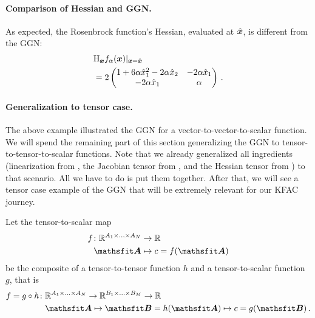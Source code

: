 \begin{example}
 \paragraph{Comparison of Hessian and GGN.}
 As expected, the Rosenbrock function's Hessian, evaluated at $\hat{{\bm{x}}}$, is different from the GGN:
  \begin{align*}
    &\mathrm{H}_{{\bm{x}}} f_{\alpha}({\bm{x}})|_{{\bm{x}} = \hat{{\bm{x}}}}
      \\
    &=
    2
    \begin{pmatrix}
      1 + 6 \alpha \hat{x}_1^2 - 2 \alpha \hat{x}_2 & -2 \alpha \hat{x}_1 \\
      -2 \alpha \hat{x}_1                      & \alpha
    \end{pmatrix}\,.
  \end{align*}
\end{example}

\paragraph{Generalization to tensor case.} The above example illustrated the GGN for a vector-to-vector-to-scalar function.
We will spend the remaining part of this section generalizing the GGN to tensor-to-tensor-to-scalar functions.
Note that we already generalized all ingredients (linearization from , the Jacobian tensor from , and the Hessian tensor from ) to that scenario.
All we have to do is put them together.
After that, we will see a tensor case example of the GGN that will be extremely relevant for our KFAC journey.

\switchcolumn[1]
\switchcolumn[0]

\begin{setup}\label{setup:composite_tensor_to_tensor_to_scalar_function}
  Let the tensor-to-scalar map
  \begin{align*}
    f\colon \sR^{A_1 \times \ldots \times A_N} & \to \sR
    \\
    \tA                                   & \mapsto c = f(\tA)
  \end{align*}
  be the composite of a tensor-to-tensor function $h$ and a tensor-to-scalar function $g$, that is
  \begin{align*}
    f = g \circ h\colon & \sR^{A_1 \times \ldots \times A_N} \to \sR^{B_1 \times \ldots \times B_M}  \to \sR\!\!
    \\
                   & \tA \mapsto \tB = h(\tA) \mapsto c = g(\tB)\,.
  \end{align*}
\end{setup}

